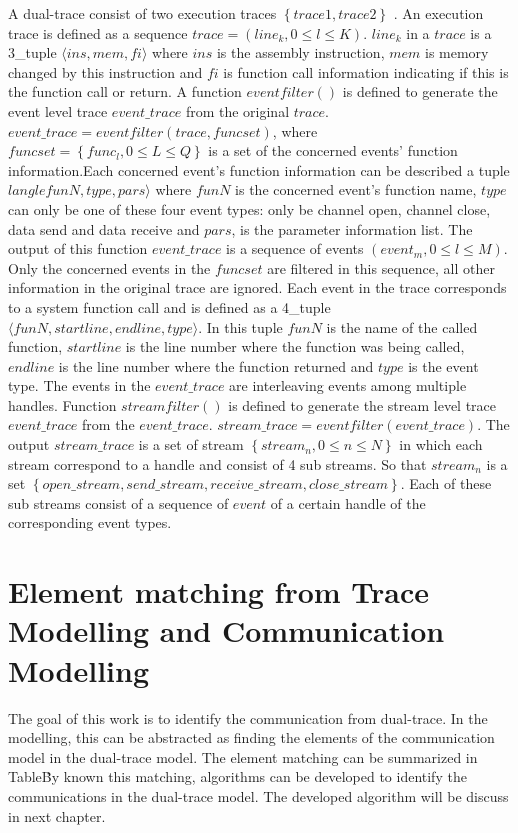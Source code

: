 A dual-trace consist of two execution traces $\left\lbrace trace1, trace2 \right\rbrace $ . An execution trace is defined as a sequence $trace = (line_{k}, 0 \leqslant l \leqslant K)$. $line_{k}$ in a $trace$ is a 3\_tuple $\langle ins, mem, fi \rangle$ where $ins$ is the assembly instruction, $mem$ is memory changed by this instruction and $fi$ is function call information indicating if this is the function call or return. A function $eventfilter \left( \right) $ is defined to generate the event level trace $event\_trace$ from the original $trace$. $event\_trace = eventfilter\left( trace, funcset\right) $, where $funcset = \left \lbrace func_{l}, 0 \leqslant L \leqslant Q\right\rbrace $ is a set of the concerned events' function information.Each concerned event's function information can be described a tuple $langle funN, type, pars \rangle$ where $funN$ is the concerned event's function name, $type$ can only be one of these four event types: only be channel open, channel close, data send and data receive and $pars$, is the parameter information list. The output of this function $event\_trace$ is a sequence of events $(event_{m}, 0 \leqslant l \leqslant M)$. Only the concerned events in the $funcset$ are filtered in this sequence, all other information in the original trace are ignored. Each event in the trace corresponds to a system function call and is defined as a 4\_tuple $\langle funN, startline, endline, type \rangle$. In this tuple $funN$ is the name of the called function, $startline$ is the line number where the function was being called, $endline$ is the line number where the function returned and $type$ is the event type. The events in the $event\_trace$ are interleaving events among multiple handles. Function  $streamfilter \left( \right) $ is defined to generate the stream level trace $event\_trace$ from the $event\_trace$. $stream\_trace =  eventfilter\left( event\_trace \right) $. The output $stream\_trace$ is a set of stream $\left \lbrace stream_{n}, 0 \leqslant n \leqslant N\right\rbrace$ in which each stream correspond to a handle and consist of 4 sub streams. So that $stream_{n} $ is a set  $\left \lbrace open\_stream, send\_stream, receive\_stream, close\_stream \right\rbrace $. Each of these sub streams consist of a sequence of $event$ of a certain handle of the corresponding event types.

\section{Element matching from Trace Modelling and Communication Modelling}
The goal of this work is to identify the communication from dual-trace. In the modelling, this can be abstracted as finding the elements of the communication model in the dual-trace model. The element matching can be summarized in Table\. By known this matching, algorithms can be developed to identify the communications in the dual-trace model. The developed algorithm will be discuss in next chapter.



